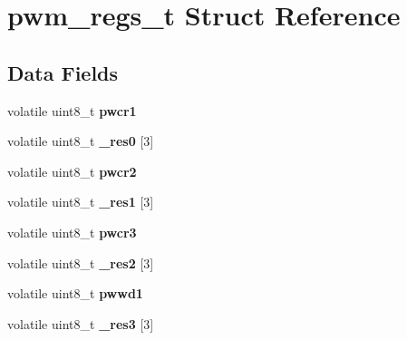 \hypertarget{structpwm__regs__t}{}\section{pwm\+\_\+regs\+\_\+t Struct Reference}
\label{structpwm__regs__t}
\subsection*{Data Fields}
\begin{DoxyCompactItemize}
\item 
\mbox{\label{structpwm__regs__t_a8f8defaa7f324aff081b5e8acb64a4cc}} 
volatile uint8\+\_\+t {\bfseries pwcr1}
\item 
\mbox{\label{structpwm__regs__t_a0338ce1e6683850a87f8cfcf2f5ad5b5}} 
volatile uint8\+\_\+t {\bfseries \+\_\+res0} \mbox{[}3\mbox{]}
\item 
\mbox{\label{structpwm__regs__t_af1c6a9f6db4dd249043472f53e3fe905}} 
volatile uint8\+\_\+t {\bfseries pwcr2}
\item 
\mbox{\label{structpwm__regs__t_aec572050f38693cf3f7e8f2b8b0b3bb8}} 
volatile uint8\+\_\+t {\bfseries \+\_\+res1} \mbox{[}3\mbox{]}
\item 
\mbox{\label{structpwm__regs__t_a69cbd2495df2936b77bd89e14df26fd4}} 
volatile uint8\+\_\+t {\bfseries pwcr3}
\item 
\mbox{\label{structpwm__regs__t_a38c3770f51f92d4e0d2520824e7baee2}} 
volatile uint8\+\_\+t {\bfseries \+\_\+res2} \mbox{[}3\mbox{]}
\item 
\mbox{\label{structpwm__regs__t_a7b4de7bed1cb250450b73dc7258307ea}} 
volatile uint8\+\_\+t {\bfseries pwwd1}
\item 
\mbox{\label{structpwm__regs__t_a9846a308a73055e687a9aba079e26971}} 
volatile uint8\+\_\+t {\bfseries \+\_\+res3} \mbox{[}3\mbox{]}
\item 
\mbox{\label{structpwm__regs__t_a5108c7286f3a53ccade35043e1abb635}} 

\end{DoxyCompactItemize}
